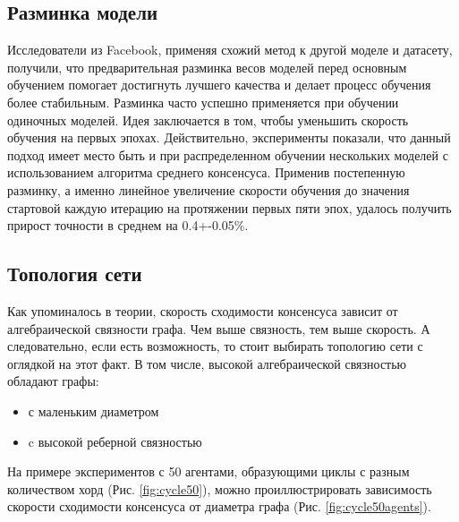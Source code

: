 \documentclass[a4paper,article,14pt]{extarticle}
\begin{document}
\subsection{Разминка модели}
Исследователи из Facebook, применяя \cite{012} схожий метод к другой моделе и датасету, получили, что предварительная разминка весов моделей перед основным обучением помогает достигнуть лучшего качества и делает процесс обучения более стабильным. Разминка часто успешно применяется при обучении одиночных моделей. Идея заключается в том, чтобы уменьшить скорость обучения на первых эпохах. Действительно, эксперименты показали, что данный подход имеет место быть и при распределенном обучении нескольких моделей с использованием алгоритма среднего консенсуса. Применив постепенную разминку, а именно линейное увеличение скорости обучения до значения стартовой каждую итерацию на протяжении первых пяти эпох, удалось получить прирост точности в среднем на 0.4+-0.05\%.

\subsection{Топология сети}
Как упоминалось в теории, скорость сходимости консенсуса зависит от алгебраической связности графа. Чем выше связность, тем выше скорость. А следовательно, если есть возможность, то стоит выбирать топологию сети с оглядкой на этот факт. В том числе, высокой алгебраической связностью обладают графы:
\begin{itemize}
    \item с маленьким диаметром
    \item c высокой реберной связностью
\end{itemize}

На примере экспериментов с 50 агентами, образующими циклы с разным количеством хорд (Рис. \ref{fig:cycle50}), можно проиллюстрировать зависимость скорости сходимости консенсуса от диаметра графа (Рис. \ref{fig:cycle50agents}).
\end{document}
